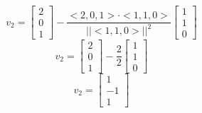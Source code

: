 \documentclass{article}
\begin{document}
\[ v_2 = \begin{bmatrix} 2 \\ 0 \\ 1 \end{bmatrix} - \frac{<2, 0, 1> \cdot <1, 1, 0>}{||<1, 1, 0>||^2} \begin{bmatrix} 1 \\ 1 \\ 0 \end{bmatrix} \]
\[ v_2 = \begin{bmatrix} 2 \\ 0 \\ 1 \end{bmatrix} - \frac{2}{2} \begin{bmatrix} 1 \\ 1 \\ 0 \end{bmatrix} \]
\[ v_2 = \begin{bmatrix} 1 \\ -1 \\ 1 \end{bmatrix} \]
\end{document}

